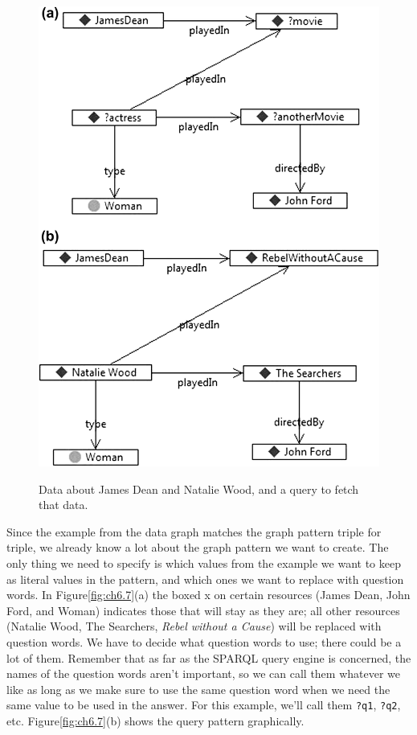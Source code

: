 \begin{figure}
\centering
\includegraphics[width=5in]{media/ch6/f06-06.png}
\label{fig:ch6.6}
\caption{Data about James Dean and Natalie Wood, and a query to fetch that data.}
\end{figure}


Since the example from the data graph matches the graph pattern triple
for triple, we already know a lot about the graph pattern we want to
create. The only thing we need to specify is which values from the
example we want to keep as literal values in the pattern, and which ones
we want to replace with
question words. In Figure\ref{fig:ch6.7}(a) the boxed x on certain resources (James
Dean, John Ford, and Woman) indicates those that will stay as they are;
all other resources (Natalie Wood, The Searchers, \emph{Rebel without a
Cause}) will be replaced with question words. We have to decide what
question words to use; there could be a lot of them. Remember that as
far as the SPARQL query engine is concerned, the names of the question
words aren't important, so we can call them whatever we like as long as
we make sure to use the same question word when we need the same value
to be used in the answer. For this example, we'll call them \texttt{?q1}, \texttt{?q2},
etc. Figure\ref{fig:ch6.7}(b) shows the query pattern graphically.

